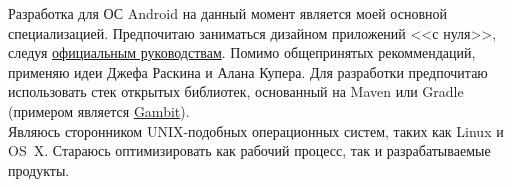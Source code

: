       Разработка для ОС Android на данный момент является моей основной специализацией.
      Предпочитаю заниматься дизайном приложений <<с нуля>>, следуя
      \href{https://developer.android.com/design/}{официальным руководствам}. 
      Помимо общепринятых рекоммендаций, применяю идеи Джефа Раскина
      и Алана Купера. Для разработки предпочитаю использовать стек
      открытых библиотек, основанный на Maven или Gradle (примером является
      \href{https://github.com/ming13/gambit}{Gambit}). \\

      Являюсь сторонником UNIX-подобных операционных систем,
      таких как Linux и OS~X. Стараюсь оптимизировать как рабочий процесс,
      так и разрабатываемые продукты. \\

  \vfill


